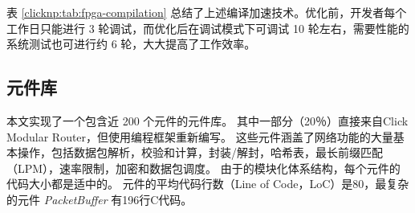 表 \ref{clicknp:tab:fpga-compilation} 总结了上述编译加速技术。优化前，开发者每个工作日只能进行 3 轮调试，而优化后在调试模式下可调试 10 轮左右，需要性能的系统测试也可进行约 6 轮，大大提高了工作效率。


\subsection{\name 元件库}
\label{clicknp:subsec:lib}

本文实现了一个包含近 200 个元件的\name 元件库。
其中一部分（20％）直接来自Click Modular Router，但使用\name 编程框架重新编写。
这些元件涵盖了网络功能的大量基本操作，包括数据包解析，校验和计算，封装/解封，哈希表，最长前缀匹配（LPM），速率限制，加密和数据包调度。
由于\name 的模块化体系结构，每个元件的代码大小都是适中的。
元件的平均代码行数（Line of Code，LoC）是80，最复杂的元件 \textit {PacketBuffer} 有196行C代码。


